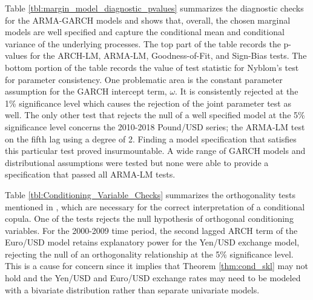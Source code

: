 \documentclass[12pt]{article}
\begin{document}
Table \ref{tbl:margin_model_diagnostic_pvalues} summarizes the diagnostic checks for the ARMA-GARCH models and shows that, overall, the chosen marginal models are well specified and capture the conditional mean and conditional variance of the underlying processes. The top part of the table records the p-values for the ARCH-LM, ARMA-LM, Goodness-of-Fit, and Sign-Bias tests. The bottom portion of the table records the value of test statistic for Nyblom's test for parameter consistency. One problematic area is the constant parameter assumption for the GARCH intercept term, $\omega$. It is consistently rejected at the 1\% significance level which causes the rejection of the joint parameter test as well. The only other test that rejects the null of a well specified model at the 5\% significance level concerns the 2010-2018 Pound/USD series; the ARMA-LM test on the fifth lag using a degree of 2. Finding a model specification that satisfies this particular test proved insurmountable. A wide range of GARCH models and distributional assumptions were tested but none were able to provide a specification that passed all ARMA-LM tests.

Table \ref{tbl:Conditioning_Variable_Checks} summarizes the orthogonality tests mentioned in \cite{Patton_2006}, which are necessary for the correct interpretation of a conditional copula. One of the tests rejects the null hypothesis of orthogonal conditioning variables. For the 2000-2009 time period, the second lagged ARCH term of the Euro/USD model retains explanatory power for the Yen/USD exchange model, rejecting the null of an orthogonality relationship at the 5\% significance level. This is a cause for concern since it implies that Theorem \ref{thm:cond_skl} may not hold and the Yen/USD and Euro/USD exchange rates may need to be modeled with a bivariate distribution rather than separate univariate models.
\end{document}
